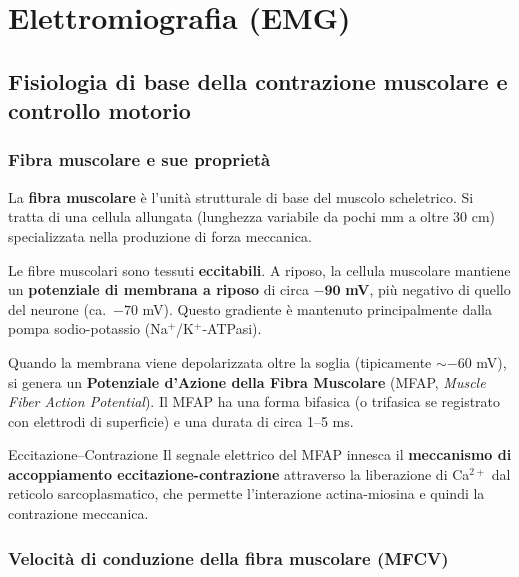 \chapter{Elettromiografia (EMG)}

\section{Fisiologia di base della contrazione muscolare e controllo motorio}

\subsection{Fibra muscolare e sue proprietà}

La \textbf{fibra muscolare} è l'unità strutturale di base del muscolo scheletrico. Si tratta di una cellula allungata (lunghezza variabile da pochi mm a oltre 30 cm) specializzata nella produzione di forza meccanica.

\begin{definizione}
Le fibre muscolari sono tessuti \textbf{eccitabili}. A riposo, la cellula muscolare mantiene un \textbf{potenziale di membrana a riposo} di circa \(\mathbf{-90}\) \textbf{mV}, più negativo di quello del neurone (ca.\ $-70$ mV). Questo gradiente è mantenuto principalmente dalla pompa sodio-potassio (Na\(^+\)/K\(^+\)-ATPasi).
\end{definizione}

Quando la membrana viene depolarizzata oltre la soglia (tipicamente $\sim -60$ mV), si genera un \textbf{Potenziale d'Azione della Fibra Muscolare} (MFAP, \textit{Muscle Fiber Action Potential}). Il MFAP ha una forma bifasica (o trifasica se registrato con elettrodi di superficie) e una durata di circa 1--5 ms.

\begin{approfondimento}{Eccitazione--Contrazione}
Il segnale elettrico del MFAP innesca il \textbf{meccanismo di accoppiamento eccitazione-contrazione} attraverso la liberazione di Ca\(^{2+}\) dal reticolo sarcoplasmatico, che permette l'interazione actina-miosina e quindi la contrazione meccanica.
\end{approfondimento}

\subsection{Velocità di conduzione della fibra muscolare (MFCV)}

